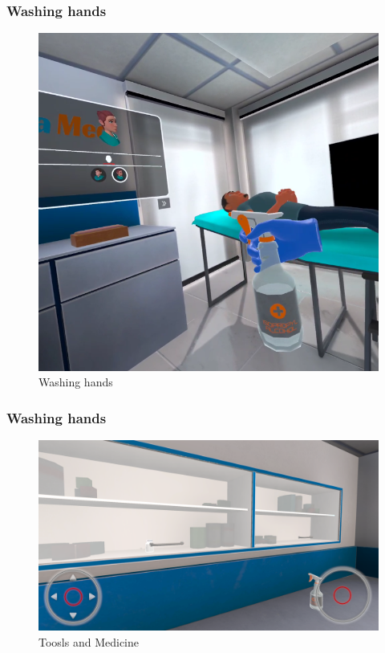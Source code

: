 \subsubsection{Washing hands}
\begin{figure}[h]
	\centering
	\includegraphics[width=0.65\linewidth]{Images/Washing hands.png}
	\caption{Washing hands}
	\label{fig:Washing-hands}
\end{figure}

\subsubsection{Washing hands}
\begin{figure}[h]
	\centering
	\includegraphics[width=0.65\linewidth]{Images/Toosls and Medicine.png}
	\caption{Toosls and Medicine}
	\label{fig:system-diagram}
\end{figure}

